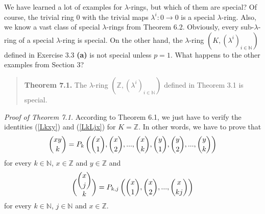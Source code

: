 \documentclass[numbers=enddot,12pt,final,onecolumn,notitlepage]{scrartcl}%
\begin{document}
We have learned a lot of examples for $\lambda$-rings, but which of them are
special? Of course, the trivial ring $0$ with the trivial maps $\lambda
^{i}:0\rightarrow0$ is a special $\lambda$-ring. Also, we know a vast class of
special $\lambda$-rings from Theorem 6.2. Obviously, every sub-$\lambda$-ring
of a special $\lambda$-ring is special. On the other hand, the $\lambda$-ring
$\left(  K,\left(  \lambda^{i}\right)  _{i\in\mathbb{N}}\right)  $ defined in
Exercise 3.3 \textbf{(a)} is not special unless $p=1$. What happens to the
other examples from Section 3?

\begin{quote}
\textbf{Theorem 7.1.} The $\lambda$-ring $\left(  \mathbb{Z},\left(
\lambda^{i}\right)  _{i\in\mathbb{N}}\right)  $ defined in Theorem 3.1 is special.
\end{quote}

\textit{Proof of Theorem 7.1.} According to Theorem 6.1, we just have to
verify the identities (\ref{Lkxy}) and (\ref{LkLjx}) for $K=\mathbb{Z}$. In
other words, we have to prove that%
\begin{equation}
\dbinom{xy}{k}=P_{k}\left(  \dbinom{x}{1},\dbinom{x}{2},...,\dbinom{x}%
{k},\dbinom{y}{1},\dbinom{y}{2},...,\dbinom{y}{k}\right)  \label{7.1.Lkxy}%
\end{equation}
for every $k\in\mathbb{N}$, $x\in\mathbb{Z}$ and $y\in\mathbb{Z}$ and%
\begin{equation}
\dbinom{\dbinom{x}{j}}{k}=P_{k,j}\left(  \dbinom{x}{1},\dbinom{x}%
{2},...,\dbinom{x}{kj}\right)  \label{7.1.LkLjx}%
\end{equation}
for every $k\in\mathbb{N}$, $j\in\mathbb{N}$ and $x\in\mathbb{Z}.$
\end{document}
